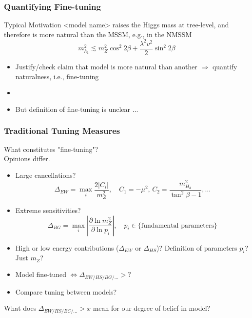 \documentclass[10pt,aspectratio=169]{beamer}
\begin{document}
\begin{frame}
  \frametitle{Quantifying Fine-tuning}
  \begin{block}{Typical Motivation}
    <model name> raises the Higgs mass at tree-level, and
    therefore is more natural than the MSSM, e.g., in the NMSSM
    \begin{equation*}
      m_{h_1}^2 \lesssim m_Z^2 \cos^2 2\beta + \frac{\lambda^2 v^2}{2}
      \sin^2 2\beta
    \end{equation*}
  \end{block}
  \begin{itemize} \itemsep1em
  \item Justify/check claim that model is more natural than another
    $\Rightarrow$ quantify naturalness, i.e., fine-tuning
  \item 
  \item \alert{But definition of fine-tuning is unclear $\ldots$}
  \end{itemize}
\end{frame}

\begin{frame}
  \frametitle{Traditional Tuning Measures}
  \begin{center}
    What constitutes "fine-tuning"? \\
    Opinions differ.
  \end{center}
  \begin{itemize} \itemsep0.8em
    \item Large cancellations?
      \begin{equation*}
        \Delta_{EW} = \max_i \frac{2|C_i|}{m_Z^2}, \quad C_1 = -\mu^2, \,
        C_2 = \frac{m_{H_d}^2}{\tan^2\beta - 1}, \ldots
      \end{equation*}
    \item Extreme sensitivities?
      \begin{equation*}
        \Delta_{BG} = \max_i \left | \frac{\partial \ln m_Z^2}
        {\partial \ln p_i} \right | , \quad p_i \in \{\text{fundamental
        parameters}\}
      \end{equation*}
    \item High or low energy contributions ($\Delta_{EW}$ or $\Delta_{HS}$)?
      Definition of parameters $p_i$? Just $m_Z$?
    \item Model fine-tuned $\Leftrightarrow \Delta_{EW/HS/BG/\ldots} > ?$
    \item Compare tuning between models?
  \end{itemize}
  \begin{center}
  \alert{What does $\Delta_{EW/HS/BC/\ldots} > x$ mean for our degree of belief
    in model?}
  \end{center}
\end{frame}
\end{document}
